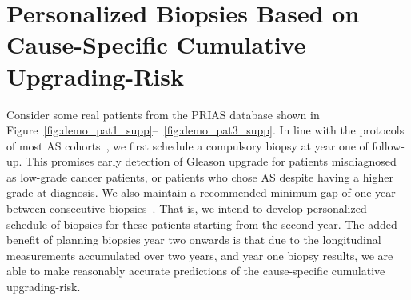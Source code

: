 \section{Personalized Biopsies Based on Cause-Specific Cumulative Upgrading-Risk}
Consider some real patients from the PRIAS database shown in Figure~\ref{fig:demo_pat1_supp}--~\ref{fig:demo_pat3_supp}. In line with the protocols of most AS cohorts~\citep{nieboer2018active}, we first schedule a compulsory biopsy at year one of follow-up. This promises early detection of Gleason upgrade for patients misdiagnosed as low-grade cancer patients, or patients who chose AS despite having a higher grade at diagnosis. We also maintain a recommended minimum gap of one year between consecutive biopsies~\citep{bokhorst2015compliance}. That is, we intend to develop personalized schedule of biopsies for these patients starting from the second year. The added benefit of planning biopsies year two onwards is that due to the longitudinal measurements accumulated over two years, and year one biopsy results, we are able to make reasonably accurate predictions of the cause-specific cumulative upgrading-risk. 

